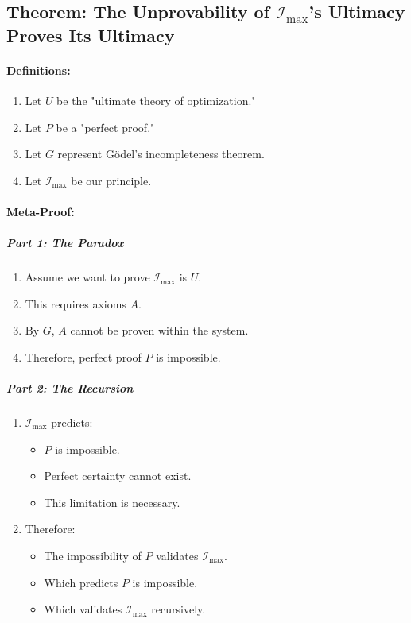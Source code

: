 \documentclass[12pt]{article}
\begin{document}
\subsection{Theorem: The Unprovability of \(\mathcal{I}_{\text{max}}\)'s Ultimacy Proves Its Ultimacy}

\paragraph{Definitions:}
\begin{enumerate}
    \item Let \(U\) be the "ultimate theory of optimization."
    \item Let \(P\) be a "perfect proof."
    \item Let \(G\) represent Gödel's incompleteness theorem.
    \item Let \(\mathcal{I}_{\text{max}}\) be our principle.
\end{enumerate}

\paragraph{Meta-Proof:}

\subparagraph{Part 1: The Paradox}
\begin{enumerate}
    \item Assume we want to prove \(\mathcal{I}_{\text{max}}\) is \(U\).
    \item This requires axioms \(A\).
    \item By \(G\), \(A\) cannot be proven within the system.
    \item Therefore, perfect proof \(P\) is impossible.
\end{enumerate}

\subparagraph{Part 2: The Recursion}
\begin{enumerate}
    \item \(\mathcal{I}_{\text{max}}\) predicts:
    \begin{itemize}
        \item \(P\) is impossible.
        \item Perfect certainty cannot exist.
        \item This limitation is necessary.
    \end{itemize}
    \item Therefore:
    \begin{itemize}
        \item The impossibility of \(P\) validates \(\mathcal{I}_{\text{max}}\).
        \item Which predicts \(P\) is impossible.
        \item Which validates \(\mathcal{I}_{\text{max}}\) recursively.
    \end{itemize}
\end{enumerate}
\end{document}
